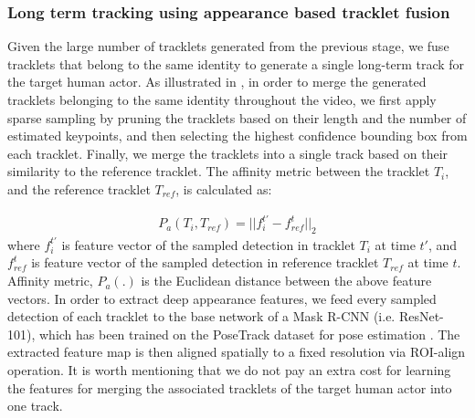 \subsubsection{Long term tracking using appearance based tracklet fusion}
\label{sec:Fusion}
Given the large number of tracklets generated from the previous stage, we fuse tracklets that belong to the same identity to generate a single long-term track for the target human actor. As illustrated in , in order to merge the generated tracklets belonging to the same identity throughout the video, we first apply sparse sampling by pruning the tracklets based on their length and the number of estimated keypoints, and then selecting the highest confidence bounding box from each tracklet. Finally, we merge the tracklets into a single track based on their similarity to the reference tracklet. The affinity metric between the tracklet $T_i$, and the reference tracklet $T_{ref}$, is calculated as:

\begin{align}\label{eqn:affinity}
 P_a(T_i, T_{ref}) = ||f^{t'}_i - f^{t}_{ref}||_2   
\end{align}
%
where $f^{t'}_i$ is feature vector of the sampled detection in tracklet $T_i$ at time $t'$, and $f^{t}_{ref}$ is feature vector of the sampled detection in reference tracklet $T_{ref}$ at time $t$. Affinity metric, $P_a(.)$ is the Euclidean distance between the above feature vectors. In order to extract deep appearance features, we feed every sampled detection of each tracklet to the base network of a Mask R-CNN (i.e. ResNet-101), which has been trained on the PoseTrack dataset for pose estimation \cite{he2017mask, he2016deep}. The extracted feature map is then aligned spatially to a fixed resolution via ROI-align operation. It is worth mentioning that we do not pay an extra cost for learning the features for merging the associated tracklets of the target human actor into one track.


